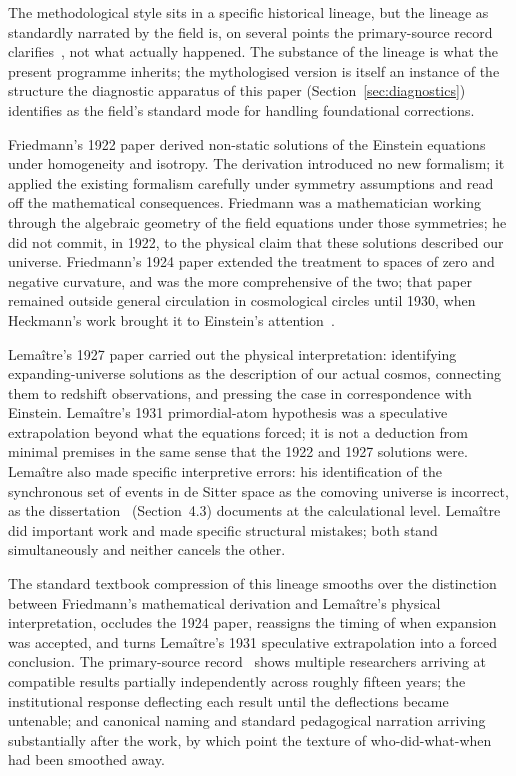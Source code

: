 \documentclass[11pt,a4paper]{article}
\theoremstyle{definition}
\begin{document}
The methodological style sits in a specific historical lineage, but the lineage as standardly narrated by the field is, on several points the primary-source record clarifies~\cite{Janzen2014}, not what actually happened. The substance of the lineage is what the present programme inherits; the mythologised version is itself an instance of the structure the diagnostic apparatus of this paper (Section~\ref{sec:diagnostics}) identifies as the field's standard mode for handling foundational corrections.

Friedmann's 1922 paper derived non-static solutions of the Einstein equations under homogeneity and isotropy. The derivation introduced no new formalism; it applied the existing formalism carefully under symmetry assumptions and read off the mathematical consequences. Friedmann was a mathematician working through the algebraic geometry of the field equations under those symmetries; he did not commit, in 1922, to the physical claim that these solutions described our universe. Friedmann's 1924 paper extended the treatment to spaces of zero and negative curvature, and was the more comprehensive of the two; that paper remained outside general circulation in cosmological circles until 1930, when Heckmann's work brought it to Einstein's attention~\cite{Janzen2014}.

Lema\^itre's 1927 paper carried out the physical interpretation: identifying expanding-universe solutions as the description of our actual cosmos, connecting them to redshift observations, and pressing the case in correspondence with Einstein. Lema\^itre's 1931 primordial-atom hypothesis was a speculative extrapolation beyond what the equations forced; it is not a deduction from minimal premises in the same sense that the 1922 and 1927 solutions were. Lema\^itre also made specific interpretive errors: his identification of the synchronous set of events in de Sitter space as the comoving universe is incorrect, as the dissertation~\cite{Janzen2012} (Section~4.3) documents at the calculational level. Lema\^itre did important work and made specific structural mistakes; both stand simultaneously and neither cancels the other.

The standard textbook compression of this lineage smooths over the distinction between Friedmann's mathematical derivation and Lema\^itre's physical interpretation, occludes the 1924 paper, reassigns the timing of when expansion was accepted, and turns Lema\^itre's 1931 speculative extrapolation into a forced conclusion. The primary-source record~\cite{Janzen2014} shows multiple researchers arriving at compatible results partially independently across roughly fifteen years; the institutional response deflecting each result until the deflections became untenable; and canonical naming and standard pedagogical narration arriving substantially after the work, by which point the texture of who-did-what-when had been smoothed away.
\end{document}
